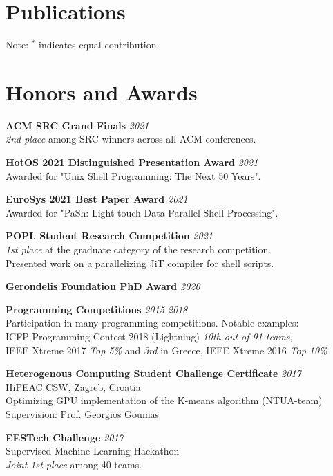 \documentclass[margin]{res}
\begin{document}
\begin{resume}
\section{Publications}



Note: $^*$ indicates equal contribution.

\section{Honors and Awards}

\textbf{ACM SRC Grand Finals} \hfill {\em 2021} \\
\textit{2nd place} among SRC winners across all ACM conferences.

\textbf{HotOS 2021 Distinguished Presentation Award} \hfill {\em 2021} \\
Awarded for "Unix Shell Programming: The Next 50 Years".

\textbf{EuroSys 2021 Best Paper Award} \hfill {\em 2021} \\
Awarded for "PaSh: Light-touch Data-Parallel Shell Processing".

\textbf{POPL Student Research Competition} \hfill {\em 2021} \\
\textit{1st place} at the graduate category of the research competition. \\
Presented work on a parallelizing JiT compiler for shell scripts. 

\textbf{Gerondelis Foundation PhD Award} \hfill {\em 2020}

\textbf{Programming Competitions}  \hfill {\em 2015-2018} \\
Participation in many programming competitions. Notable examples: \\
ICFP Programming Contest 2018 (Lightning) \textit{10th out of 91 teams}, \\
IEEE Xtreme 2017 \textit{Top 5\%} and \textit{3rd} in Greece, IEEE Xtreme 2016 \textit{Top 10\%}

\textbf{Heterogenous Computing Student Challenge Certificate}  \hfill {\em 2017} \\
HiPEAC CSW, Zagreb, Croatia \\
Optimizing GPU implementation of the K-means algorithm (NTUA-team) \\
Supervision: Prof. Georgios Goumas

\textbf{EESTech Challenge}  \hfill {\em 2017} \\ 
Supervised Machine Learning Hackathon \\
\textit{Joint 1st place} among 40 teams.


\end{resume}
\end{document}
